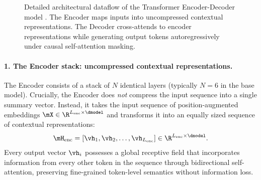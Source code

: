 \documentclass[../../main.tex]{subfiles}
\begin{document}
\begin{figure}[htbp]
\caption{Detailed architectural dataflow of the Transformer Encoder-Decoder model \cite{vaswani2017}. The Encoder maps inputs into uncompressed contextual representations. The Decoder cross-attends to encoder representations while generating output tokens autoregressively under causal self-attention masking.}
\label{fig:transformer_encoder_decoder_block}
\end{figure}

\paragraph{1. The Encoder stack: uncompressed contextual representations.}
The Encoder consists of a stack of $N$ identical layers (typically $N=6$ in the base model). Crucially, the Encoder does \emph{not} compress the input sequence into a single summary vector. Instead, it takes the input sequence of position-augmented embeddings $\mX \in \R^{L_{\text{enc}} \times \dmodel}$ and transforms it into an equally sized sequence of contextual representations:
\begin{equation}
\label{eq:encoder_uncompressed_output}
\mH_{\text{enc}} = [\vh_1, \vh_2, \dots, \vh_{L_{\text{enc}}}] \in \R^{L_{\text{enc}} \times \dmodel}.
\end{equation}
Every output vector $\vh_i$ possesses a global receptive field that incorporates information from every other token in the sequence through bidirectional self-attention, preserving fine-grained token-level semantics without information loss.
\end{document}
